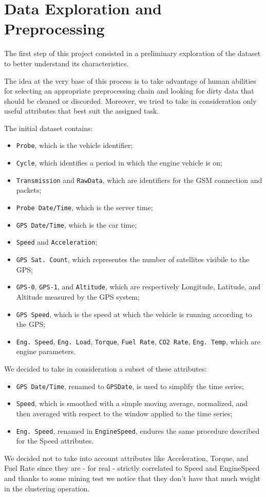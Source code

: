 \section{Data Exploration and Preprocessing}
\label{section:expandpre}
The first step of this project consisted in a preliminary exploration of the dataset to better understand its characteristics.

The idea at the very base of this process is to take advantage of human abilities for selecting an appropriate preprocessing chain and looking for dirty data that should be cleaned or discorded. Moreover, we tried to take in consideration only useful attributes that best suit the assigned task.

The initial dataset contains:
\begin{itemize}
\item \texttt{Probe}, which is the vehicle identifier;
\item \texttt{Cycle}, which identifies a period in which the engine vehicle is on;
\item \texttt{Transmission} and \texttt{RawData}, which are identifiers for the GSM connection and packets;
\item \texttt{Probe Date/Time}, which is the server time;
\item \texttt{GPS Date/Time}, which is the car time;
\item \texttt{Speed} and \texttt{Acceleration};
\item \texttt{GPS Sat. Count}, which representes the number of satellites visibile to the GPS;
\item \texttt{GPS-0}, \texttt{GPS-1}, and \texttt{Altitude}, which are respectively Longitude, Latitude, and Altitude measured by the GPS system;
\item \texttt{GPS Speed}, which is the speed at which the vehicle is running according to the GPS;
\item \texttt{Eng. Speed}, \texttt{Eng. Load}, \texttt{Torque}, \texttt{Fuel Rate}, \texttt{CO2 Rate}, \texttt{Eng. Temp}, which are engine parameters.
\end{itemize}
We decided to take in consideration a subset of these attributes:
\begin{itemize}
\item \texttt{GPS Date/Time}, renamed to \texttt{GPSDate}, is used to simplify the time series;
\item \texttt{Speed}, which is smoothed with a simple moving average, normalized, and then averaged with respect to the window applied to the time series;
\item \texttt{Eng. Speed}, renamed in \texttt{EngineSpeed}, endures the same procedure described for the Speed attributes.
\end{itemize}
We decided not to take into account attributes like Acceleration, Torque, and Fuel Rate since they are - for real - strictly correlated to Speed and EngineSpeed and thanks to some mining test we notice that they don't have that much weight in the clustering operation.


